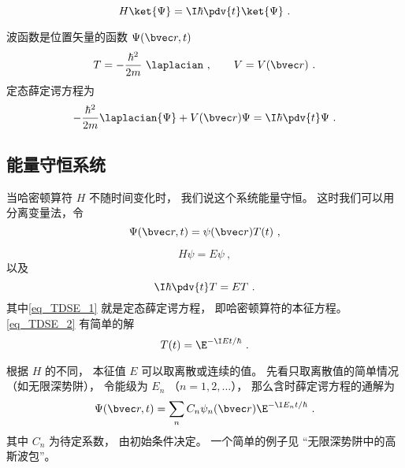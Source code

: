 
\begin{issues}
\issueDraft
\issueAbstract
{}
\end{issues}


\begin{equation}
H \ket{\Psi} = \I\hbar \pdv{t} \ket{\Psi}~.
\end{equation}


波函数是位置矢量的函数 $\Psi(\bvec r, t)$
\begin{equation}
T = -\frac{\hbar^2}{2m}~\laplacian~, \qquad V = V(\bvec r)~.
\end{equation}
定态薛定谔方程为
\begin{equation}
-\frac{\hbar^2}{2m} \laplacian {\Psi} + V(\bvec r)\Psi = \I\hbar \pdv{t} \Psi~.
\end{equation}

\subsection{能量守恒系统}
当哈密顿算符 $H$ 不随时间变化时， 我们说这个系统能量守恒。 这时我们可以用分离变量法，令
\begin{equation}
\Psi(\bvec r, t) = \psi(\bvec r) T(t)~,
\end{equation}
 
\begin{equation}\label{eq_TDSE_1}
H\psi = E\psi~,
\end{equation}
以及
\begin{equation}\label{eq_TDSE_2}
\I \hbar\pdv{t}T = ET~.
\end{equation}
其中\autoref{eq_TDSE_1} 就是定态薛定谔方程， 即哈密顿算符的本征方程。 \autoref{eq_TDSE_2} 有简单的解
\begin{equation}
T(t) = \E^{-\I E t/\hbar}~.
\end{equation}

根据 $H$ 的不同， 本征值 $E$ 可以取离散或连续的值。 先看只取离散值的简单情况（如无限深势阱）， 令能级为 $E_n$ （$n = 1, 2, \dots$）， 那么含时薛定谔方程的通解为
\begin{equation}\label{eq_TDSE_5}
\Psi(\bvec r, t) = \sum_n C_n \psi_n(\bvec r) \E^{-\I E_n t/\hbar}~.
\end{equation}
其中 $C_n$ 为待定系数， 由初始条件决定。 一个简单的例子见 “无限深势阱中的高斯波包”。

